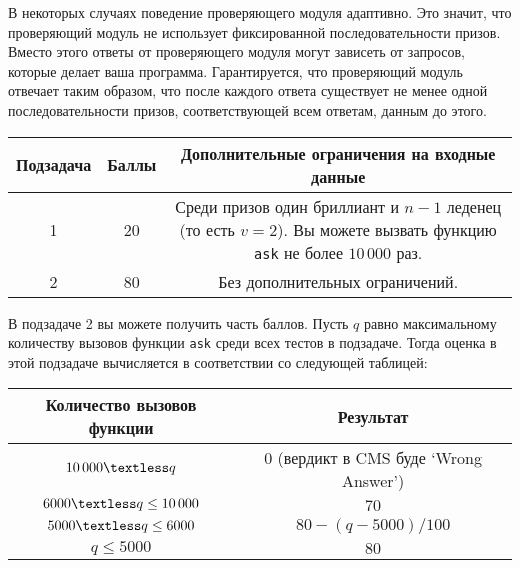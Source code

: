 В некоторых случаях поведение проверяющего модуля адаптивно. Это значит, что
проверяющий модуль не использует фиксированной последовательности призов. Вместо этого
ответы от проверяющего модуля могут зависеть от запросов, которые делает ваша программа.
Гарантируется, что проверяющий модуль отвечает таким образом, что после каждого ответа
существует не менее одной последовательности призов, соответствующей всем ответам,
данным до этого.

\begin{center}
\renewcommand{\arraystretch}{1.5}
\begin{tabular}{|c|c|c|}
\hline
Подзадача & Баллы & Дополнительные ограничения на входные данные\\
\hline
1 &  20 & \parbox{13cm}{\centering \vspace{2mm}Среди призов один бриллиант и $n - 1$ леденец (то есть $v = 2$). Вы можете вызвать функцию \texttt{ask} не более $10\,000$ раз. \\\vspace{2mm}} \\
 & 80 & Без дополнительных ограничений. \\
\hline
\end{tabular}
\end{center}

В подзадаче 2 вы можете получить часть баллов. Пусть $q$ равно максимальному количеству
вызовов функции \texttt{ask} среди всех тестов в подзадаче. Тогда оценка в этой подзадаче
вычисляется в соответствии со следующей таблицей:
\newcommand{\lt}{\textless}

\begin{center}
\renewcommand{\arraystretch}{1.5}
\begin{tabular}{|c|c|}
\hline
Количество вызовов функции & Результат \\
\hline
$10\,000 \lt q$ & $0$ (вердикт в CMS буде `Wrong Answer') \\
\hline
$6000 \lt q \leq 10\,000$ & $70$ \\
\hline
$5000 \lt q \leq 6000$ & $80 - (q-5000)/100$ \\
\hline
$q \leq 5000$ & $80$ \\
\hline
\end{tabular}
\end{center}


